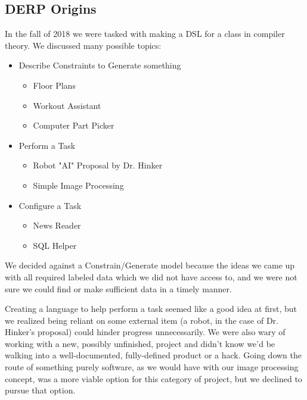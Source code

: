 \documentclass{article}
\begin{document}
\subsection{DERP Origins}
In the fall of 2018 we were tasked with making a DSL for a class in compiler theory. We discussed many possible topics:
\begin{itemize}
    \item{Describe Constraints  to Generate something}
    \begin{itemize}
        \item{Floor Plans}
        \item{Workout Assistant}
        \item{Computer Part Picker}
    \end{itemize}
    \item{Perform a Task}
    \begin{itemize}
        \item{Robot "AI" Proposal by Dr. Hinker}
        \item{Simple Image Processing}
    \end{itemize}
    \item{Configure a Task}
    \begin{itemize}
        \item{News Reader}
        \item{SQL Helper}        
    \end{itemize}
\end{itemize}

We decided against a Constrain/Generate model because the ideas we came up with all required labeled data which we did not have access to, and we were not sure we could find or make sufficient data in a timely manner.

Creating a language to help perform a task seemed like a good idea at first, but we realized being reliant on some external item (a robot, in the case of Dr. Hinker's proposal) could hinder progress unnecessarily. We were also wary of working with a new, possibly unfinished, project and didn't know we'd be walking into a well-documented, fully-defined product or a hack. Going down the route of something purely software, as we would have with our image processing concept, was a more viable option for this category of project, but we declined to pursue that option.

\begin{comment}
Do we want to talk about why we didn't go with the image processing project?
\end{comment}
\end{document}
